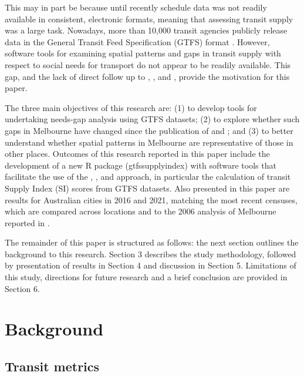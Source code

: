 \documentclass[preprint, 3p,
authoryear]{elsarticle} %
\begin{document}
This may in part be because until recently schedule data was not readily
available in consistent, electronic formats, meaning that assessing
transit supply was a large task. Nowadays, more than 10,000 transit
agencies publicly release data in the General Transit Feed Specification
(GTFS) format \citep{GTFS}. However, software tools for examining
spatial patterns and gaps in transit supply with respect to social needs
for transport do not appear to be readily available. This gap, and the
lack of direct follow up to \citet{Currie2003Hobart},
\citet{Currie2004Gap}, \citet{Currie2007Identifying} and
\citet{currie2010identifying}, provide the motivation for this paper.

The three main objectives of this research are: (1) to develop tools for
undertaking needs-gap analysis using GTFS datasets; (2) to explore
whether such gaps in Melbourne have changed since the publication of
\citet{Currie2007Identifying} and \citet{currie2010identifying}; and (3)
to better understand whether spatial patterns in Melbourne are
representative of those in other places. Outcomes of this research
reported in this paper include the development of a new R package
(gtfssupplyindex) with software tools that facilitate the use of the
\citet{Currie2003Hobart}, \citet{Currie2004Gap},
\citet{Currie2007Identifying} and \citet{currie2010identifying}
approach, in particular the calculation of transit Supply Index (SI)
scores from GTFS datasets. Also presented in this paper are results for
Australian cities in 2016 and 2021, matching the most recent censuses,
which are compared across locations and to the 2006 analysis of
Melbourne reported in \citet{currie2010identifying}.

The remainder of this paper is structured as follows: the next section
outlines the background to this research. Section 3 describes the study
methodology, followed by presentation of results in Section 4 and
discussion in Section 5. Limitations of this study, directions for
future research and a brief conclusion are provided in Section 6.

\hypertarget{background}{%
\section{Background}\label{background}}

\hypertarget{transit-metrics}{%
\subsection{Transit metrics}\label{transit-metrics}}
\end{document}

